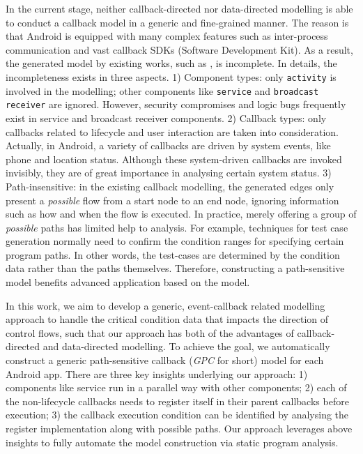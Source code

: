 In the current stage, neither callback-directed nor data-directed modelling is able to conduct a callback model in a generic and fine-grained manner. The reason is that Android is equipped with many complex features such as inter-process communication and vast callback SDKs (Software Development Kit). As a result, the generated model by existing works, such as \cite{new2013contextual,new2015static, new2015window}, is incomplete. In details, the incompleteness exists in three aspects. 1) Component types: only \texttt{activity} is involved in the modelling; other components like \texttt{service} and \texttt{broadcast receiver} are ignored. However, security compromises and logic bugs frequently exist in service and broadcast receiver components. 2) Callback types: only callbacks related to lifecycle and user interaction are taken into consideration. Actually, in Android, a variety of callbacks are driven by system events, like phone and location status. Although these system-driven callbacks are invoked invisibly, they are of great importance in analysing certain system status. 3) Path-insensitive: in the existing callback modelling, the generated edges only present a \textit{possible} flow from a start node to an end node, ignoring information such as how and when the flow is executed. In practice, merely offering a group of \textit{possible} paths has limited help to analysis. For example, techniques for test case generation normally need to confirm the condition ranges for specifying certain program paths. In other words, the test-cases are determined by the condition data rather than the paths themselves. Therefore, constructing a path-sensitive model benefits advanced application based on the model.    

In this work, we aim to develop a generic, event-callback related modelling approach to handle the critical condition data that impacts the direction of control flows, such that our approach has both of the advantages of callback-directed and data-directed modelling. To achieve the goal, we automatically construct a generic path-sensitive callback (\textit{GPC} for short) model for each Android app. There are three key insights underlying our approach: 1) components like service run in a parallel way with other components; 2) each of the non-lifecycle callbacks needs to register itself in their parent callbacks before execution; 3) the callback execution condition can be identified by analysing the register implementation along with possible paths. Our approach leverages above insights to fully automate the model construction via static program analysis. 

